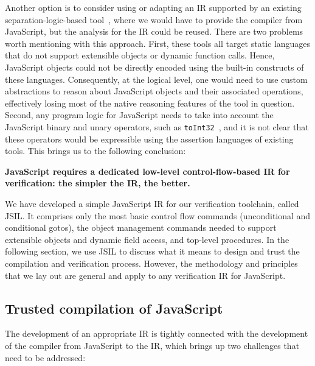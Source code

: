 \documentclass{llncs}
\newcommand{\jsil}{JSIL\xspace}
\def\jsinline{\lstinline[language=JavaScript, basicstyle=\small]}
\newif\ifComments
\newcommand{\pg}[1]{%
\ifComments
\begin{center}
\fbox{%
\begin{minipage}{\textwidth} \color{red}
{\bf PG:} {\rm #1}
\end{minipage}
}
\end{center}
\fi
}
\begin{document}
Another option is to consider using or adapting an IR supported by  an
existing separation-logic-based
tool~\cite{smallf,slayerp,jstar,jacobs2011verifast,abductor,calcagno2015moving}, where we
would have to provide the compiler from 
JavaScript, but the analysis for the IR could be reused. 
There are two problems worth mentioning with this approach. First, these tools all target static 
languages that do not support extensible objects or dynamic function calls. Hence, JavaScript 
objects could not be directly encoded using the built-in constructs of these languages. Consequently, 
at the logical level, one would need to use custom abstractions to reason about JavaScript objects and their
associated operations, effectively losing most of the native reasoning features of the tool in question. Second, any program logic for JavaScript needs to take into account the JavaScript 
binary and unary operators, such as \jsinline|toInt32|~\cite{ecma}, and it is not clear that these operators would be expressible using the assertion languages of existing tools. This brings us to the following conclusion:

\begin{center}
{\bfseries \small
JavaScript requires a dedicated low-level control-flow-based IR for
verification: the simpler the IR, the better.}
\end{center}

We have developed a simple JavaScript  IR for our verification
toolchain, called \jsil. It comprises only the most basic control flow
commands (unconditional and conditional gotos), the object management
commands needed to support extensible objects and dynamic field
access, and top-level procedures. In the following section, we use
\jsil to discuss what it means to design and trust the compilation and
verification process.
However, the methodology and principles that we lay out are general and apply
to any verification IR for JavaScript.


\vspace*{-0.2cm}
\subsection{Trusted compilation of JavaScript}

The development of an appropriate IR is tightly connected with the
development of the compiler from JavaScript to the IR, which
brings up two challenges that need to be addressed:
\end{document}
